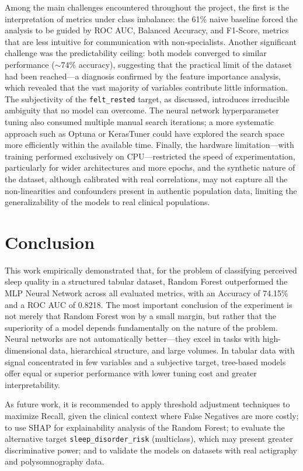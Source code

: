 \documentclass[conference]{IEEEtran}
\begin{document}
Among the main challenges encountered throughout the project, the first is the interpretation of metrics under class imbalance: the 61\% naive baseline forced the analysis to be guided by ROC AUC, Balanced Accuracy, and F1-Score, metrics that are less intuitive for communication with non-specialists. Another significant challenge was the predictability ceiling: both models converged to similar performance (${\sim}74\%$ accuracy), suggesting that the practical limit of the dataset had been reached---a diagnosis confirmed by the feature importance analysis, which revealed that the vast majority of variables contribute little information. The subjectivity of the \texttt{felt\_rested} target, as discussed, introduces irreducible ambiguity that no model can overcome. The neural network hyperparameter tuning also consumed multiple manual search iterations; a more systematic approach such as Optuna or KerasTuner could have explored the search space more efficiently within the available time. Finally, the hardware limitation---with training performed exclusively on CPU---restricted the speed of experimentation, particularly for wider architectures and more epochs, and the synthetic nature of the dataset, although calibrated with real correlations, may not capture all the non-linearities and confounders present in authentic population data, limiting the generalizability of the models to real clinical populations.

\section{Conclusion}

This work empirically demonstrated that, for the problem of classifying perceived sleep quality in a structured tabular dataset, Random Forest outperformed the MLP Neural Network across all evaluated metrics, with an Accuracy of 74.15\% and a ROC AUC of 0.8218. The most important conclusion of the experiment is not merely that Random Forest won by a small margin, but rather that the superiority of a model depends fundamentally on the nature of the problem. Neural networks are not automatically better---they excel in tasks with high-dimensional data, hierarchical structure, and large volumes. In tabular data with signal concentrated in few variables and a subjective target, tree-based models offer equal or superior performance with lower tuning cost and greater interpretability.

As future work, it is recommended to apply threshold adjustment techniques to maximize Recall, given the clinical context where False Negatives are more costly; to use SHAP for explainability analysis of the Random Forest; to evaluate the alternative target \texttt{sleep\_disorder\_risk} (multiclass), which may present greater discriminative power; and to validate the models on datasets with real actigraphy and polysomnography data.
\end{document}
